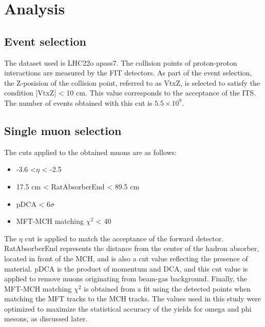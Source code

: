 \section{Analysis}
    \subsection{Event selection}
        The dataset used is LHC22o apass7. The collision points of proton-proton interactions are measured by the FIT detectors. As part of the event selection, the Z-posision of the collision point, referred to as VtxZ, is selected to satisfy the condition |VtxZ| < 10 cm. This value corresponds to the acceptance of the ITS. The number of events obtained with this cut is $5.5\times10^9$.
    
    \subsection{Single muon selection}
        The cuts applied to the obtained muons are as follows:
        \begin{itemize}{}
            \item -3.6 <$\eta$ < -2.5
            \item 17.5 cm < RatAbsorberEnd < 89.5 cm
            \item pDCA < 6$\sigma$
            \item MFT-MCH matching $\chi^2$ < 40
        \end{itemize}
        The $\eta$ cut is applied to match the acceptance of the forward detector. RatAbsorberEnd represents the distance from the center of the hadron absorber, located in front of the MCH, and is also a cut value reflecting the presence of material. pDCA is the product of momentum and DCA, and this cut value is applied to remove muons originating from beam-gas background. Finally, the MFT-MCH matching $\chi^2$ is obtained from a fit using the detected points when matching the MFT tracks to the MCH tracks. The values used in this study were optimized to maximize the statistical accuracy of the yields for omega and phi mesons, as discussed later.
